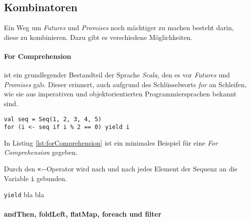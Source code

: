 \subsection{Kombinatoren}

Ein Weg um \emph{Futures} und \emph{Promises} noch mächtiger
zu machen besteht darin, diese zu kombinieren. Dazu gibt es verschiedene
Möglichkeiten.

\paragraph{For Comprehension} ist ein grundlegender Bestandteil
der Sprache \emph{Scala}, den es vor \emph{Futures} und \emph{Promises}
gab. Dieser erinnert, auch aufgrund des Schlüsselworts \emph{for}
an Schleifen, wie sie aus imperativen und objektorientierten
Programmiersprachen bekannt sind.

\begin{lstlisting}[caption={For Comprehension},label={lst:forComprehension},captionpos=b]
val seq = Seq(1, 2, 3, 4, 5)
for (i <- seq if i % 2 == 0) yield i
\end{lstlisting}

In Listing \ref{lst:forComprehension} ist ein minimales Beispiel für
eine \emph{For Comprehension} gegeben.

Durch den \texttt{<-}-Operator wird nach und nach jedes Element
der Sequenz an die Variable \texttt{i} gebunden.

\texttt{yield} bla bla

\paragraph{andThen, foldLeft, flatMap, foreach und filter}
